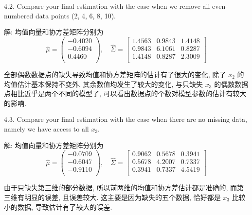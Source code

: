 \documentclass{article}
\begin{document}
4.2. Compare your final estimation with the case when we remove all even-numbered data points (2, 4, 6, 8, 10).

解: 均值向量和协方差矩阵分别为
\begin{equation}
  \hat{\mu}=
  \begin{pmatrix}
    -0.4020\\
    -0.6094\\
    0.4460\\
  \end{pmatrix},
  \quad
  \hat{\Sigma}=
  \begin{bmatrix}
    1.4563 & 0.9843 & 1.4148 \\
    0.9843 & 6.1061 & 0.8287 \\
    1.4148 & 0.8287 & 2.3009 \\
  \end{bmatrix}
\end{equation}

全部偶数数据点的缺失导致均值和协方差矩阵的估计有了很大的变化, 除了 $x_2$ 的均值估计基本保持不变外, 其余数值均发生了较大的变化, 与只缺失 $x_3$ 的偶数数据点相比近乎是两个不同的模型了, 可以看出数据点的个数对模型参数的估计有较大的影响.

4.3. Compare your final estimation with the case when there are no missing data, namely we have access to all $x_3$.

解: 均值向量和协方差矩阵分别为
\begin{equation}
  \hat{\mu}=
  \begin{pmatrix}
    -0.0709\\
    -0.6047\\
    -0.9110\\
  \end{pmatrix},
  \quad
  \hat{\Sigma}=
  \begin{bmatrix}
    0.9062 & 0.5678 & 0.3941 \\
    0.5678 & 4.2007 & 0.7337 \\
    0.3941 & 0.7337 & 4.5419 \\
  \end{bmatrix}
\end{equation}

由于只缺失第三维的部分数据, 所以前两维的均值和协方差估计都是准确的, 而第三维有明显的误差, 且误差较大. 这主要是因为缺失的五个数据, 恰好都是 $x_3$ 比较小的数据, 导致估计有了较大的误差.

\begin{thebibliography}{1}
\end{thebibliography}
\end{document}
